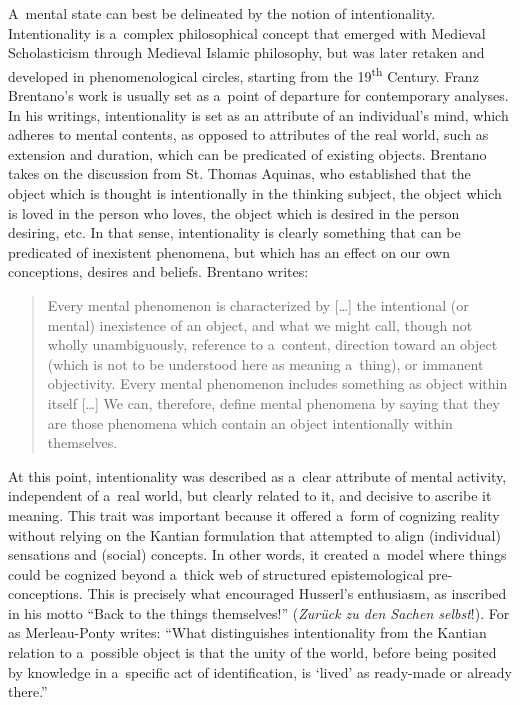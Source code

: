 A~mental state can best be delineated by the notion of intentionality. Intentionality is a~complex philosophical concept that emerged with Medieval Scholasticism through Medieval Islamic philosophy, but was later retaken and developed in phenomenological circles, starting from the 19\textsuperscript{th} Century. Franz Brentano's work is usually set as a~point of departure for contemporary analyses. In his writings, intentionality is set as an attribute of an individual's mind, which adheres to mental contents, as opposed to attributes of the real world, such as extension and duration, which can be predicated of existing objects. Brentano takes on the discussion from St. Thomas Aquinas, who established that the object which is thought is intentionally in the thinking subject, the object which is loved in the person who loves, the object which is desired in the person desiring, etc. In that sense, intentionality is clearly something that can be predicated of inexistent phenomena, but which has an effect on our own conceptions, desires and beliefs. Brentano
\parencite*[][p.68]{brentano_psychology_1995} %
 writes:

\begin{quotation}
Every mental phenomenon is characterized by […] the intentional (or mental) inexistence of an object, and what we might call, though not wholly unambiguously, reference to a~content, direction toward an object (which is not to be understood here as meaning a~thing), or immanent objectivity. Every mental phenomenon includes something as object within itself […] We can, therefore, define mental phenomena by saying that they are those phenomena which contain an object intentionally within themselves.

\end{quotation}
At this point, intentionality was described as a~clear attribute of mental activity, independent of a~real world, but clearly related to it, and decisive to ascribe it meaning. This trait was important because it offered a~form of cognizing reality without relying on the Kantian formulation that attempted to align (individual) sensations and (social) concepts. In other words, it created a~model where things could be cognized beyond a~thick web of structured epistemological pre-conceptions. This is precisely what encouraged Husserl's enthusiasm, as inscribed in his motto ``Back to the things themselves!'' (\textit{Zurück zu den Sachen selbst}!). For as Merleau-Ponty
\parencite*[][p.xix]{merleau-ponty_phenomenology_2005} %
 writes: ``What distinguishes intentionality from the Kantian relation to a~possible object is that the unity of the world, before being posited by knowledge in a~specific act of identification, is ‘lived' as ready-made or already there.''


